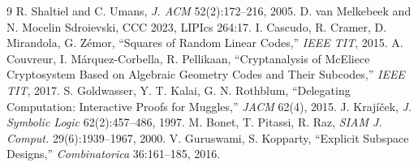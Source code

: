 \documentclass[11pt]{article}
\begin{document}
\begin{thebibliography}{9}
 R. Shaltiel and C. Umans, \emph{J. ACM} 52(2):172--216, 2005.
 D. van Melkebeek and N. Mocelin Sdroievski, CCC 2023, LIPIcs 264:17.
 I. Cascudo, R. Cramer, D. Mirandola, G. Z\'emor, ``Squares of Random Linear Codes,'' \emph{IEEE TIT}, 2015.
 A. Couvreur, I. M\'arquez-Corbella, R. Pellikaan, ``Cryptanalysis of McEliece Cryptosystem Based on Algebraic Geometry Codes and Their Subcodes,'' \emph{IEEE TIT}, 2017.
 S. Goldwasser, Y. T. Kalai, G. N. Rothblum, ``Delegating Computation: Interactive Proofs for Muggles,'' \emph{JACM} 62(4), 2015.
 J. Kraj\'i\v{c}ek, \emph{J. Symbolic Logic} 62(2):457--486, 1997.
 M. Bonet, T. Pitassi, R. Raz, \emph{SIAM J. Comput.} 29(6):1939--1967, 2000.
 V. Guruswami, S. Kopparty, ``Explicit Subspace Designs,'' \emph{Combinatorica} 36:161--185, 2016.
\end{thebibliography}
\end{document}

